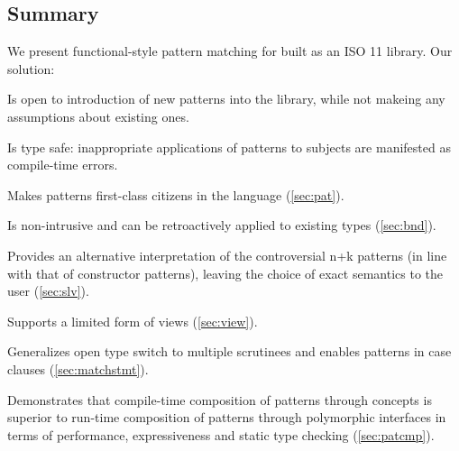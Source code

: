 
\subsection{Summary}

We present functional-style pattern matching for \Cpp{} built as an ISO 
\Cpp{}11 library. Our solution:

\begin{compactitem}
\setlength{\itemsep}{0pt}
\setlength{\parskip}{0pt}
  \item Is open to introduction of new patterns into the library, while not 
        makeing any assumptions about existing ones.
  \item Is type safe: inappropriate applications of patterns to subjects are 
        manifested as compile-time errors.
  \item Makes patterns first-class citizens in the language (\textsection\ref{sec:pat}).
  \item Is non-intrusive and can be retroactively applied to existing types (\textsection\ref{sec:bnd}).
  \item Provides an alternative interpretation of the controversial n+k 
        patterns (in line with that of constructor patterns), leaving the choice 
        of exact semantics to the user (\textsection\ref{sec:slv}).
  \item Supports a limited form of views (\textsection\ref{sec:view}).
  \item Generalizes open type switch to multiple scrutinees and enables patterns 
        in case clauses (\textsection\ref{sec:matchstmt}).
  \item Demonstrates that compile-time composition of patterns through 
        concepts is superior to run-time composition of patterns through 
        polymorphic interfaces in terms of performance, expressiveness and 
        static type checking (\textsection\ref{sec:patcmp}).
\end{compactitem}

